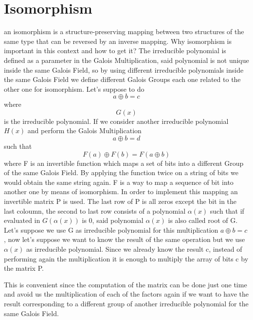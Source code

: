 \documentclass{article}
\begin{document}
\section{Isomorphism}
an isomorphism is a structure-preserving mapping between two structures of the same type that can be reversed by an inverse mapping.
Why isomorphism is important in this context and how to get it?
The irreducible polynomial is defined as a parameter in the Galois Multiplication, said polynomial is not unique inside the same Galois Field, so by using different irreducible polynomials inside the same Galois Field we define different Galois Groups each one related to the other one for isomorphism.
Let's suppose to do   $$ a \oplus b = c $$ where $$ G(x) $$ is the irreducible polynomial.
If we consider another irreducible polynomial $ H(x) $ and perform the Galois Multiplication $$ a \oplus b = d $$ such that $$ F(a) \oplus F(b) = F(a\oplus b) $$ where F is an invertible function which maps a set of bits into a different Group of the same Galois Field. By applying the function twice on a string of bits we would obtain the same string again.
F is a way to map a sequence of bit into another one by means of isomorphism.
In order to implement this mapping an invertible matrix P is used. The last row of P is all zeros except the bit in the last coloumn, the second to last row consists of a polynomial $ \alpha (x) $ such that if evaluated in $ G ( \alpha (x) ) $ is 0, said polynomial $  \alpha (x) $ is also called root of G.
Let's suppose we use G as irreducible polynomial for this multiplication $ a \oplus b = c $, now let's suppose we want to know the result of the same operation but we use $  \alpha (x) $  as irreducible polynomial. Since we already know the result c, instead of performing again the multiplication it is enough to multiply the array of bits c by the matrix P.

This is convenient since the computation of the matrix can be done just one time and avoid us the multiplication of each of the factors again if we want to have the result corresponding to a different group of another irreducible polynomial for the same Galois Field.
\end{document}
